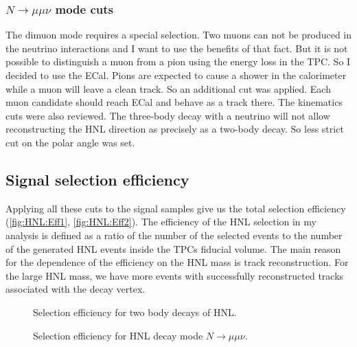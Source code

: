 \documentclass[../main.tex]{subfiles}
\begin{document}
\subsubsection{\texorpdfstring{$N\to\mu\mu\nu$}{Lg}  mode cuts}
The dimuon mode requires a special selection. Two muons can not be produced in the neutrino interactions and I want to use the benefits of that fact. But it is not possible to distinguish a muon from a pion using the energy loss in the TPC. So I decided to use the ECal. Pions are expected to cause a shower in the calorimeter while a muon will leave a clean track. So an additional cut was applied. Each muon candidate should reach ECal and behave as a track there. The kinematics cuts were also reviewed. The three-body decay with a neutrino will not allow reconstructing the HNL direction as precisely as a two-body decay. So less strict cut on the polar angle was set.

\subsection{Signal selection efficiency}
\label{sec:HNL:eff}

Applying all these cuts to the signal samples give us the total selection efficiency (\autoref{fig:HNL:Eff1}, \autoref{fig:HNL:Eff2}). The efficiency of the HNL selection in my analysis is defined as a ratio of the number of the selected events to the number of the generated HNL events inside the TPCs fiducial volume. The main reason for the dependence of the efficiency on the HNL mass is track reconstruction. For the large HNL mass, we have more events with successfully reconstructed tracks associated with the decay vertex.

\begin{figure}[!ht]
  \begin{minipage}{0.49\linewidth}
  \end{minipage}
  \hfill
  \begin{minipage}{0.49\linewidth}
  \end{minipage}
  \caption{Selection efficiency for two body decays of HNL.}
  \label{fig:HNL:Eff1}
\end{figure}

\begin{figure}[!ht]
  \caption{Selection efficiency for HNL decay mode $N\to\mu\mu\nu$.}
  \label{fig:HNL:Eff2}
\end{figure}
\end{document}
